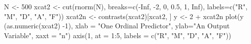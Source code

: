 \begin{Schunk}
\begin{Sinput}
 N <- 500 
 xcat2 <- cut(rnorm(N), breaks=c(-Inf, -2, 0, 0.5, 1, Inf), labels=c("R", "M", "D", "A", "F"))
 xcat2n <- contrasts(xcat2)[xcat2, ]	
 y <- 2 + xcat2n %*% c(3.5, -2.0, 1.3, -0.2) + 1 * rnorm(N)
 plot(y ~ (as.numeric(xcat2) -1), xlab = "One Ordinal Predictor", ylab="An Output Variable", xaxt = "n")
 axis(1, at = 1:5, labels = c("R", "M", "D", "A", "F"))
\end{Sinput}
\end{Schunk}
